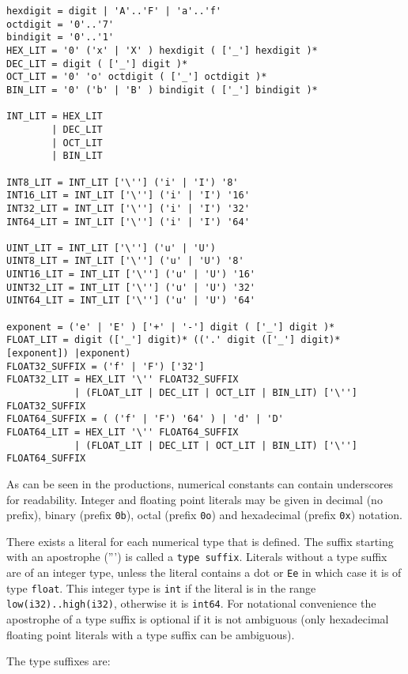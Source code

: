 \begin{verbatim}
hexdigit = digit | 'A'..'F' | 'a'..'f'
octdigit = '0'..'7'
bindigit = '0'..'1'
HEX_LIT = '0' ('x' | 'X' ) hexdigit ( ['_'] hexdigit )*
DEC_LIT = digit ( ['_'] digit )*
OCT_LIT = '0' 'o' octdigit ( ['_'] octdigit )*
BIN_LIT = '0' ('b' | 'B' ) bindigit ( ['_'] bindigit )*

INT_LIT = HEX_LIT
        | DEC_LIT
        | OCT_LIT
        | BIN_LIT

INT8_LIT = INT_LIT ['\''] ('i' | 'I') '8'
INT16_LIT = INT_LIT ['\''] ('i' | 'I') '16'
INT32_LIT = INT_LIT ['\''] ('i' | 'I') '32'
INT64_LIT = INT_LIT ['\''] ('i' | 'I') '64'

UINT_LIT = INT_LIT ['\''] ('u' | 'U')
UINT8_LIT = INT_LIT ['\''] ('u' | 'U') '8'
UINT16_LIT = INT_LIT ['\''] ('u' | 'U') '16'
UINT32_LIT = INT_LIT ['\''] ('u' | 'U') '32'
UINT64_LIT = INT_LIT ['\''] ('u' | 'U') '64'

exponent = ('e' | 'E' ) ['+' | '-'] digit ( ['_'] digit )*
FLOAT_LIT = digit (['_'] digit)* (('.' digit (['_'] digit)* [exponent]) |exponent)
FLOAT32_SUFFIX = ('f' | 'F') ['32']
FLOAT32_LIT = HEX_LIT '\'' FLOAT32_SUFFIX
            | (FLOAT_LIT | DEC_LIT | OCT_LIT | BIN_LIT) ['\''] FLOAT32_SUFFIX
FLOAT64_SUFFIX = ( ('f' | 'F') '64' ) | 'd' | 'D'
FLOAT64_LIT = HEX_LIT '\'' FLOAT64_SUFFIX
            | (FLOAT_LIT | DEC_LIT | OCT_LIT | BIN_LIT) ['\''] FLOAT64_SUFFIX
\end{verbatim}

As can be seen in the productions, numerical constants can contain
underscores for readability. Integer and floating point literals may be
given in decimal (no prefix), binary (prefix \texttt{0b}), octal (prefix
\texttt{0o}) and hexadecimal (prefix \texttt{0x}) notation.

There exists a literal for each numerical type that is defined. The
suffix starting with an apostrophe (''') is called a
\texttt{type\ suffix}. Literals without a type suffix are of an integer
type, unless the literal contains a dot or \texttt{E\textbar{}e} in
which case it is of type \texttt{float}. This integer type is
\texttt{int} if the literal is in the range
\texttt{low(i32)..high(i32)}, otherwise it is \texttt{int64}. For
notational convenience the apostrophe of a type suffix is optional if it
is not ambiguous (only hexadecimal floating point literals with a type
suffix can be ambiguous).

The type suffixes are:

